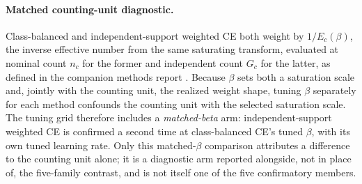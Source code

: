 \documentclass[11pt]{article}
\begin{document}
\paragraph{Matched counting-unit diagnostic.}
Class-balanced and independent-support weighted CE both weight by $1/E_c(\beta)$, the inverse effective number from the same saturating transform, evaluated at nominal count $n_c$ for the former and independent count $G_c$ for the latter, as defined in the companion methods report \citep{queisler2026imbalanceMethods}. Because $\beta$ sets both a saturation scale and, jointly with the counting unit, the realized weight shape, tuning $\beta$ separately for each method confounds the counting unit with the selected saturation scale. The tuning grid therefore includes a \emph{matched-beta} arm: independent-support weighted CE is confirmed a second time at class-balanced CE's tuned $\beta$, with its own tuned learning rate. Only this matched-$\beta$ comparison attributes a difference to the counting unit alone; it is a diagnostic arm reported alongside, not in place of, the five-family contrast, and is not itself one of the five confirmatory members.
\end{document}
